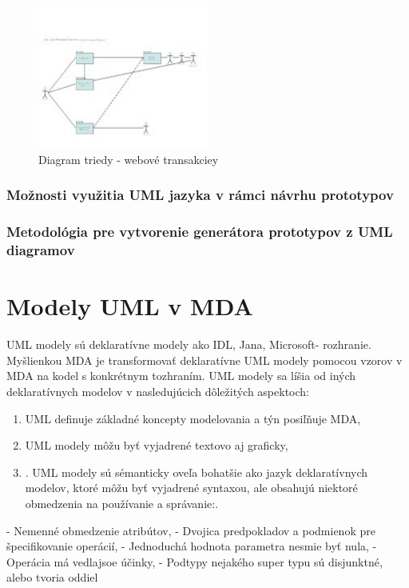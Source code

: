 \documentclass[a4paper]{feidippp}
\begin{document}
\begin{figure}[!ht]
\centering 
\includegraphics[width=0.5\textwidth]{dp9.jpg}
\caption{Diagram triedy - webové transakciey}
\end{figure}

\subsubsection{Možnosti využitia UML jazyka v rámci návrhu prototypov}
\subsubsection{ Metodológia pre vytvorenie generátora prototypov z UML diagramov}

\section{	Modely UML v MDA}

UML modely sú deklaratívne modely ako IDL, Jana, Microsoft- rozhranie.
Myšlienkou MDA je transformovať deklaratívne UML modely pomocou vzorov v MDA na kodel s konkrétnym tozhraním. UML modely sa líšia od iných deklaratívnych modelov v nasledujúcich dôležitých aspektoch:

\begin{enumerate}
  \item 	UML definuje základné koncepty modelovania a týn posiľňuje MDA, 
  \item UML modely môžu byť vyjadrené textovo aj graficky, 
  \item .	UML modely sú sémanticky oveľa bohatšie ako jazyk deklaratívnych modelov, ktoré môžu byť vyjadrené syntaxou, ale obsahujú niektoré obmedzenia na používanie a správanie:. 
\end{enumerate}


-	Nemenné obmedzenie atribútov,
-	Dvojica predpokladov a podmienok pre špecifikovanie operácií,
-	Jednoduchá hodnota parametra nesmie byť nula,
-	Operácia má vedlajsoe účinky,
-	Podtypy nejakého super typu sú disjunktné, alebo tvoria oddiel
\end{document}
